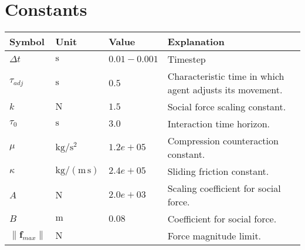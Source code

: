 \section{Constants}


\begin{tabularx}{1.0\linewidth}{ l l l l }
Symbol         & Unit & Value & Explanation \\
\hline
\hline
$ \Delta t $ & $ \mathrm{s} $ & $ 0.01-0.001 $ & Timestep \\
\hline
\hline
$ \tau_{adj} $ & $ \mathrm{s} $ & $ 0.5 $ & Characteristic time in which agent adjusts its movement. \\
$ k $          & $ \mathrm{N} $ & $ 1.5 $ & Social force scaling constant. \\
$ \tau_{0} $   & $ \mathrm{s} $ & $ 3.0 $ & Interaction time horizon. \\
$ \mu $        & $ \mathrm{kg / s^{2}} $ & $ 1.2e+05 $ & Compression counteraction constant. \\
$ \kappa $     & $ \mathrm{kg / (m\,s)} $ & $ 2.4e+05 $ & Sliding friction constant. \\
$ A $          & $ \mathrm{N} $ & $ 2.0e+03 $ & Scaling coefficient for social force. \\
$ B $          & $ \mathrm{m} $ & $ 0.08 $ & Coefficient for social force. \\
\hline
\hline
$ \left\|\mathbf{f}_{max}\right\| $    & $ \mathrm{N} $ &  & Force magnitude limit. \\
\hline
\end{tabularx} 


